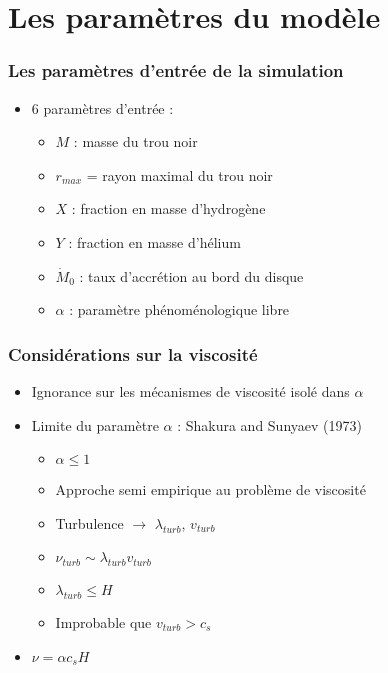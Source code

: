 \section{Les paramètres du modèle}
\begin{frame}
\frametitle{Les paramètres d'entrée de la simulation}
\begin{itemize}
	\item 6 paramètres d'entrée :
	\begin{itemize}
		\item $M$ : masse du trou noir
		\item $r_{max}$ = rayon maximal du trou noir
		\item $X$ : fraction en masse d'hydrogène
		\item $Y$ : fraction en masse d'hélium
		\item $\dot{M}_{0}$ : taux d'accrétion au bord du disque
		\item $\alpha$ : paramètre phénoménologique libre 
	\end{itemize}
\end{itemize}
\end{frame} 

\begin{frame}
\frametitle{Considérations sur la viscosité}
	\begin{itemize}
		\item Ignorance sur les mécanismes de viscosité isolé dans 					$\alpha$ \\
		
		\item Limite du paramètre $\alpha$ : Shakura and Sunyaev (1973)
			\begin{itemize}
				\item $\alpha \le 1$
				\item Approche semi empirique au problème de viscosité
				\item Turbulence $\rightarrow$ $\lambda_{turb}$, 							$v_{turb}$
				\item $\nu_{turb} \sim \lambda_{turb} v_{turb}$
				\item $\lambda_{turb} \le H$
				\item Improbable que $v_{turb} > c_{s}$
			\end{itemize}
		\item $\nu = \alpha c_{s} H$
	\end{itemize}
\end{frame}
